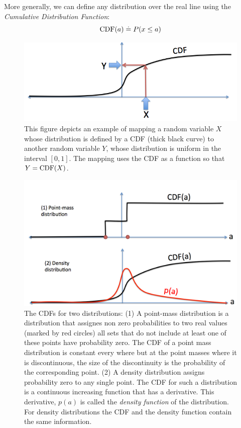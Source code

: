 More generally, we can define any distribution over the real line
using the {\em Cumulative Distribution Function}:
\[
\mbox{CDF}(a) \doteq P(x \leq a)
\]

\begin{figure}[th]
\begin{center}
\includegraphics[width=5in]{figs/CDFmapping.png}
\end{center}
\caption{This figure depicts an example of mapping a random variable
  $X$ whose distribution is defined by a CDF (thick black curve) to
  another random variable $Y$, whose distribution is uniform in the
  interval $[0,1]$. The mapping uses the CDF as a function so that
  $Y=\mbox{CDF}(X)$. \label{fig:CDFmap}}
\end{figure}

\begin{figure}[h]
\begin{center}
\includegraphics[width=5in]{figs/CDFs.png}
\end{center}
\caption{The CDFs for two distributions: (1) A point-mass distribution
  is a distribution that assignes non zero probabilities to two real
  values (marked by red circles) all sets that do not include at least
  one of these points have probability zero. The CDF of a point mass
  distribution is constant every where but at the point masses where
  it is discontinuous, the size of the discontinuity is the
  probability of the corresponding point. (2) A density distribution
  assigns probability zero to any single point. The CDF for such a
  distribution is a continuous increasing function that has a
  derivative. This derivative, $p(a)$ is called the {\em density function} of
  the distribution. For density distributions the CDF and the density
  function contain the same information.\label{fig:CDF}}
\end{figure}

